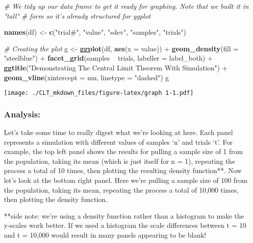\documentclass[]{article}
\newenvironment{Shaded}{\begin{snugshade}}{\end{snugshade}}
\newcommand{\KeywordTok}[1]{\textcolor[rgb]{0.13,0.29,0.53}{\textbf{{#1}}}}
\newcommand{\DataTypeTok}[1]{\textcolor[rgb]{0.13,0.29,0.53}{{#1}}}
\newcommand{\StringTok}[1]{\textcolor[rgb]{0.31,0.60,0.02}{{#1}}}
\newcommand{\CommentTok}[1]{\textcolor[rgb]{0.56,0.35,0.01}{\textit{{#1}}}}
\newcommand{\NormalTok}[1]{{#1}}
\begin{document}
\begin{Shaded}
\begin{Highlighting}[]
\CommentTok{# We tidy up our data frame to get it ready for graphing. Note that we built it in "tall"}
\CommentTok{# form so it's already structured for ggplot}

\KeywordTok{names}\NormalTok{(df) <-}\StringTok{ }\KeywordTok{c}\NormalTok{(}\StringTok{"trial#"}\NormalTok{, }\StringTok{"value"}\NormalTok{, }\StringTok{"sdev"}\NormalTok{, }\StringTok{"samples"}\NormalTok{, }\StringTok{"trials"}\NormalTok{)}

\CommentTok{# Creating the plot}
\NormalTok{g <-}\StringTok{ }\KeywordTok{ggplot}\NormalTok{(df, }\KeywordTok{aes}\NormalTok{(}\DataTypeTok{x =} \NormalTok{value)) +}\StringTok{ }\KeywordTok{geom_density}\NormalTok{(}\DataTypeTok{fill =} \StringTok{"steelblue"}\NormalTok{) +}\StringTok{ }
\StringTok{        }\KeywordTok{facet_grid}\NormalTok{(samples ~}\StringTok{ }\NormalTok{trials, }\DataTypeTok{labeller =} \NormalTok{label_both) +}\StringTok{ }
\StringTok{        }\KeywordTok{ggtitle}\NormalTok{(}\StringTok{"Demonstrating The Central Limit Theorem With Simulation"}\NormalTok{) +}\StringTok{ }
\StringTok{        }\KeywordTok{geom_vline}\NormalTok{(}\DataTypeTok{xintercept =} \NormalTok{mu, }\DataTypeTok{linetype =} \StringTok{"dashed"}\NormalTok{)}
\NormalTok{g}
\end{Highlighting}
\end{Shaded}

\texttt{[image: ./CLT\_mkdown\_files/figure-latex/graph 1-1.pdf]}

\subsubsection{Analysis:}\label{analysis}

Let's take some time to really digest what we're looking at here. Each
panel represents a simulation with different values of samples `n' and
trials `t'. For example, the top left panel shows the results for
pulling a sample size of 1 from the population, taking its mean (which
is just itself for n = 1), repeating the process a total of 10 times,
then plotting the resulting density function**. Now let's look at the
bottom right panel. Here we're pulling a sample size of 100 from the
population, taking its mean, repeating the process a total of 10,000
times, then plotting the density function.

**side note: we're using a density function rather than a histogram to
make the y-scales work better. If we used a histogram the scale
differences between t = 10 and t = 10,000 would result in many panels
appearing to be blank!
\end{document}
